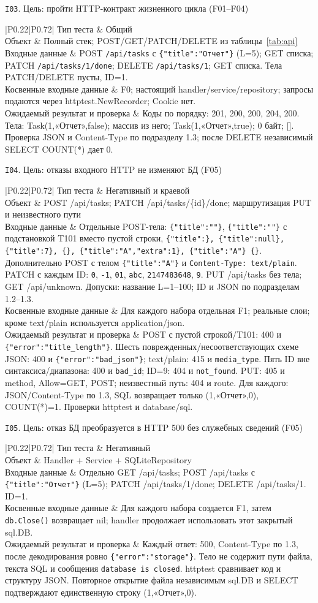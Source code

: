 \documentclass[12pt,a4paper]{extarticle}
\newcommand{\code}[1]{\nolinkurl{#1}}
\newcommand{\rucode}[1]{\texttt{#1}}
\newcommand{\testcase}[6]{%
  \par\addvspace{12pt}\noindent #1\par\nopagebreak
  \begin{longtable}{|P{0.22\textwidth}|P{0.72\textwidth}|}
  \hline
  Тип теста & #2 \\ \hline
  Объект & #3 \\ \hline
  Входные данные & #4 \\ \hline
  Косвенные входные данные & #5 \\ \hline
  Ожидаемый результат и проверка & #6 \\ \hline
  \end{longtable}}
\begin{document}
\testcase{\texttt{I03}. Цель: пройти HTTP-контракт жизненного цикла (F01--F04)}
{Общий}
{Полный стек; POST/GET/PATCH/DELETE из таблицы~\ref{tab:api}}
{POST \code{/api/tasks} с \rucode{\{"title":"Отчет"\}} (L=5);
GET списка; PATCH \code{/api/tasks/1/done}; DELETE \code{/api/tasks/1};
GET списка. Тела PATCH/DELETE пусты, ID=1.}
{F0; настоящий handler/service/repository;
запросы подаются через httptest.NewRecorder; Cookie нет.}
{Коды по порядку: 201, 200, 200, 204, 200.
Тела: Task(1,«Отчет»,false); массив из него;
Task(1,«Отчет»,true); 0 байт; [].
Проверка JSON и Content-Type по подразделу 1.3;
после DELETE независимый SELECT COUNT(*) дает 0.}

\testcase{\texttt{I04}. Цель: отказы входного HTTP не изменяют БД (F05)}
{Негативный и краевой}
{POST /api/tasks; PATCH /api/tasks/\{id\}/done;
маршрутизация PUT и неизвестного пути}
{Отдельные POST-тела: \rucode{\{"title":""\}},
\rucode{\{"title":""\}} с подстановкой T101 вместо пустой строки,
\rucode{\{"title":\},\allowbreak{} \{"title":null\},\allowbreak{} \{"title":7\},\allowbreak{} \{\},\allowbreak{}
\{"title":"А",\allowbreak{}"extra":1\},\allowbreak{} \{"title":"А"\} \{\}}.
Дополнительно POST с телом \rucode{\{"title":"А"\}} и
\code{Content-Type: text/plain}.
PATCH с каждым ID: \code{0}, \code{-1}, \code{01}, \code{abc},
\code{2147483648}, \code{9}.
PUT /api/tasks без тела; GET /api/unknown.
Допуски: название L=1--100; ID и JSON по подразделам 1.2--1.3.}
{Для каждого набора отдельная F1; реальные слои;
кроме text/plain используется application/json.}
{POST с пустой строкой/T101: 400 и \rucode{\{"error":"title\_length"\}}.
Шесть поврежденных/несоответствующих схеме JSON: 400 и
\rucode{\{"error":"bad\_json"\}}; text/plain: 415 и \code{media_type}.
Пять ID вне синтаксиса/диапазона: 400 и \code{bad_id}; ID=9: 404 и \code{not_found}.
PUT: 405 и method, Allow=GET, POST; неизвестный путь: 404 и route.
Для каждого: JSON/Content-Type по 1.3, SQL возвращает только (1,«Отчет»,0),
COUNT(*)=1. Проверки httptest и database/sql.}

\testcase{\texttt{I05}. Цель: отказ БД преобразуется в HTTP 500 без служебных сведений (F05)}
{Негативный}
{Handler + Service + SQLiteRepository}
{Отдельно GET /api/tasks; POST /api/tasks с
\rucode{\{"title":"Отчет"\}} (L=5); PATCH /api/tasks/1/done;
DELETE /api/tasks/1. ID=1.}
{Для каждого набора создается F1, затем \code{db.Close()} возвращает nil;
handler продолжает использовать этот закрытый sql.DB.}
{Каждый ответ: 500, Content-Type по 1.3,
после декодирования ровно \rucode{\{"error":"storage"\}}.
Тело не содержит пути файла, текста SQL и сообщения \code{database is closed}.
httptest сравнивает код и структуру JSON.
Повторное открытие файла независимым sql.DB и SELECT подтверждают
единственную строку (1,«Отчет»,0).}
\end{document}

